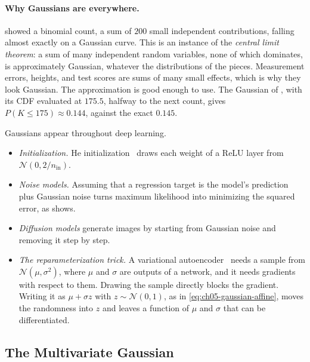 \paragraph{Why Gaussians are everywhere.}
 showed a binomial count, a sum of $200$ small
independent contributions, falling almost exactly on a Gaussian curve.
This is an instance of the \emph{central limit theorem}: a sum of many
independent random variables, none of which dominates, is approximately
Gaussian, whatever the distributions of the pieces. Measurement errors,
heights, and test scores are sums of many small effects, which is why
they look Gaussian. The approximation is good enough to use. The
Gaussian of , with its CDF evaluated at $175.5$,
halfway to the next count, gives $P(K \le 175) \approx 0.144$, against
the exact $0.145$.

\begin{aibox}
  Gaussians appear throughout deep learning.
  \begin{itemize}
    \item \emph{Initialization.} He initialization~\cite{he2015delving}
      draws each weight of
      a ReLU layer from $\mathcal{N}(0, 2/n_{\text{in}})$.
    \item \emph{Noise models.} Assuming that a regression target is the
      model's prediction plus Gaussian noise turns maximum likelihood
      into minimizing the squared error, as  shows.
    \item \emph{Diffusion models} generate images by starting from
      Gaussian noise and removing it step by step.
    \item \emph{The reparameterization trick.} A variational
      autoencoder~\cite{kingma2014vae}
      needs a sample from $\mathcal{N}(\mu, \sigma^2)$, where $\mu$ and
      $\sigma$ are outputs of a network, and it needs gradients with
      respect to them. Drawing the sample directly blocks the gradient.
      Writing it as $\mu + \sigma z$ with $z \sim \mathcal{N}(0, 1)$, as
      in \cref{eq:ch05-gaussian-affine}, moves the randomness into $z$
      and leaves a function of $\mu$ and $\sigma$ that can be
      differentiated.
  \end{itemize}
\end{aibox}

\subsection{The Multivariate Gaussian}
\label{sec:ch05-mvn}

